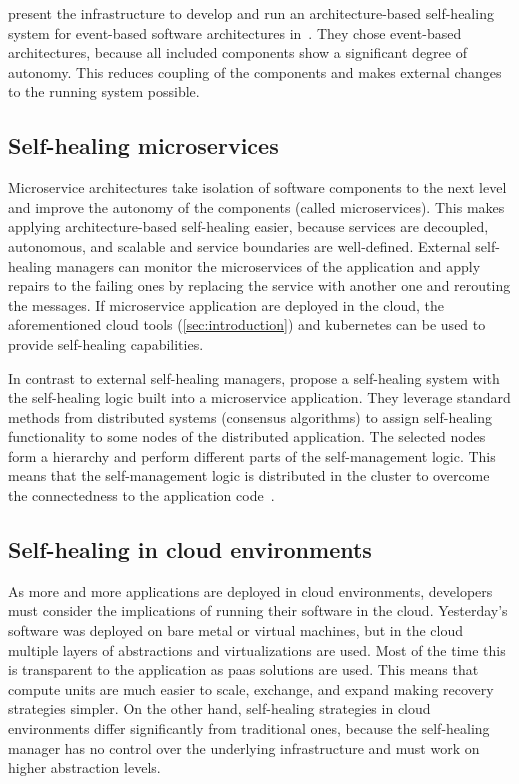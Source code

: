   \citeauthor{DashofyArchitecture} present the infrastructure to develop and run an architecture-based self-healing system for event-based software architectures in~\cite{DashofyArchitecture}.
  They chose event-based architectures, because all included components show a significant degree of autonomy.
  This reduces coupling of the components and makes external changes to the running system possible.

\subsection{Self-healing microservices}
  Microservice architectures take isolation of software components to the next level and improve the autonomy of the components (called microservices).
  This makes applying architecture-based self-healing easier, because services are decoupled, autonomous, and scalable and service boundaries are well-defined.
  External self-healing managers can monitor the microservices of the application and apply repairs to the failing ones by replacing the service with another one and rerouting the messages.
  If microservice application are deployed in the cloud, the aforementioned cloud tools (\cref{sec:introduction}) and \gls{kubernetes} can be used to provide self-healing capabilities.

  In contrast to external self-healing managers, \citeauthor{ToffettiMicroservices} propose a self-healing system with the self-healing logic built into a microservice application.
  They leverage standard methods from distributed systems (\ie consensus algorithms) to assign self-healing functionality to some nodes of the distributed application.
  The selected nodes form a hierarchy and perform different parts of the self-management logic.
  This means that the self-management logic is distributed in the cluster to overcome the connectedness to the application code~\cite{ToffettiMicroservices}.

\subsection{Self-healing in cloud environments}\label{sec:self-healing:cloud}
  As more and more applications are deployed in cloud environments, developers must consider the implications of running their software in the cloud.
  Yesterday's software was deployed on bare metal or virtual machines, but in the cloud multiple layers of abstractions and virtualizations are used.
  Most of the time this is transparent to the application as \gls{paas} solutions are used.
  This means that compute units are much easier to scale, exchange, and expand making recovery strategies simpler.
  On the other hand, self-healing strategies in cloud environments differ significantly from traditional ones, because the self-healing manager has no control over the underlying infrastructure and must work on higher abstraction levels.

